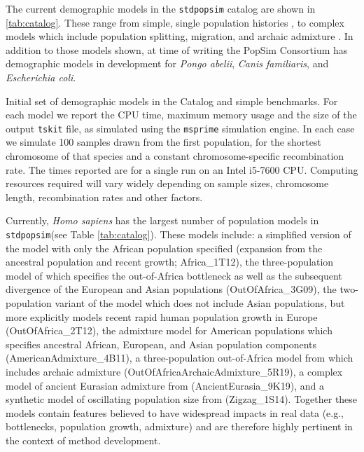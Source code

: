 \documentclass[12pt,halfline,a4paper]{ouparticle}
\newcommand{\stdpopsim}{\texttt{stdpopsim}\xspace}
\newcommand{\tskit}{\texttt{tskit}\xspace}
\begin{document}
The current demographic models in the \stdpopsim catalog are shown in \autoref{tab:catalog}.
These range from
simple, single population histories \cite[e.g.,][]{sheehan2016deep},
to complex models which include population splitting, migration, and archaic
admixture \cite[e.g.,][]{ragsdale2019models}.
In addition to those models shown, at time of writing
the PopSim Consortium has demographic models in development for \textit{Pongo abelii}, \textit{Canis familiaris}, and \textit{Escherichia coli}.

\renewcommand{\arraystretch}{1.2}
\begin{table}[t]
\makebox[\textwidth][c]{
    \begin{footnotesize}
    
    \end{footnotesize}
}
\caption{\label{tab:catalog}
Initial set of demographic models in the Catalog and simple benchmarks.
For each model we report the CPU time, maximum memory usage and the
size of the output \tskit file, as simulated using the \texttt{msprime} simulation engine.
In each case we simulate 100 samples
drawn from the first population, for the shortest chromosome of that species
and a constant chromosome-specific recombination rate.
The times reported are for a single run on an Intel i5-7600 CPU.
Computing resources required will vary widely depending on sample sizes, chromosome length,
recombination rates and other factors.
}
\end{table}

Currently, {\em Homo sapiens} has the largest number of population models in
\stdpopsim (see Table \ref{tab:catalog}).
These models include: a simplified version of the \cite{tennessen2012evolution}
model with only the African population specified (expansion from the ancestral
population and recent growth; Africa\_1T12), the three-population model of \cite{gutenkunst2009inferring}
which specifies the out-of-Africa bottleneck as well as the subsequent divergence of
the European and Asian populations (OutOfAfrica\_3G09), the \cite{tennessen2012evolution} two-population variant of the
\citeauthor{gutenkunst2009inferring} model which does not include Asian populations, but more explicitly models
recent rapid human population growth in Europe (OutOfAfrica\_2T12), the \cite{browning2018ancestry} admixture model
for American populations which specifies ancestral African, European, and Asian population
components (AmericanAdmixture\_4B11), a three-population out-of-Africa model from \cite{ragsdale2019models}
which includes archaic admixture (OutOfAfricaArchaicAdmixture\_5R19),
a complex model of ancient Eurasian admixture from \cite{kamm2019efficiently} (AncientEurasia\_9K19),
and a synthetic model of oscillating population size from \cite{schiffels2014inferring} (Zigzag\_1S14).
Together these models
contain features believed to have widespread impacts in real data (e.g., bottlenecks, population growth,
admixture) and are therefore highly pertinent in the context of method development.
\end{document}
